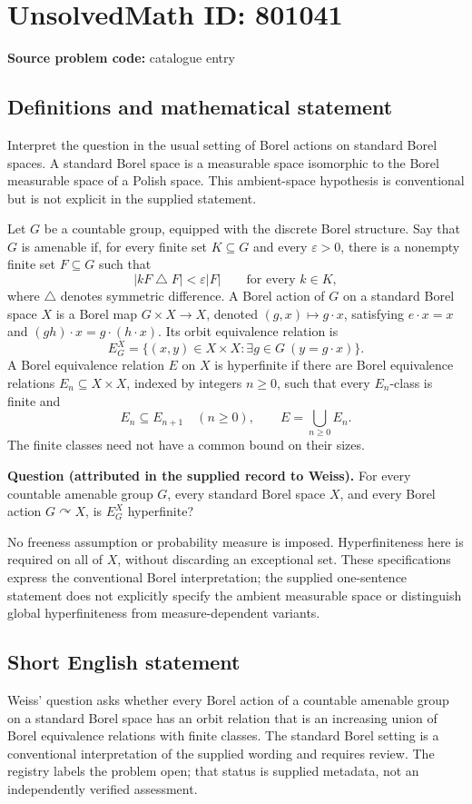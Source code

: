 \documentclass[11pt]{article}
\begin{document}
\section*{UnsolvedMath ID: 801041}
\textbf{Source problem code:} catalogue entry
\subsection{Definitions and mathematical statement}
Interpret the question in the usual setting of Borel actions on standard Borel spaces. A standard Borel space is a measurable space isomorphic to the Borel measurable space of a Polish space. This ambient-space hypothesis is conventional but is not explicit in the supplied statement.

Let \(G\) be a countable group, equipped with the discrete Borel structure. Say that \(G\) is amenable if, for every finite set \(K\subseteq G\) and every \(\varepsilon>0\), there is a nonempty finite set \(F\subseteq G\) such that
\[
 |kF\mathbin{\triangle}F|<\varepsilon |F|\qquad\text{for every }k\in K,
\]
where \(\triangle\) denotes symmetric difference. A Borel action of \(G\) on a standard Borel space \(X\) is a Borel map \(G\times X\to X\), denoted \((g,x)\mapsto g\cdot x\), satisfying \(e\cdot x=x\) and \((gh)\cdot x=g\cdot(h\cdot x)\). Its orbit equivalence relation is
\[
 E_G^X=\{(x,y)\in X\times X:\exists g\in G\ (y=g\cdot x)\}.
\]
A Borel equivalence relation \(E\) on \(X\) is hyperfinite if there are Borel equivalence relations \(E_n\subseteq X\times X\), indexed by integers \(n\geq 0\), such that every \(E_n\)-class is finite and
\[
 E_n\subseteq E_{n+1}\quad(n\geq0),\qquad E=\bigcup_{n\geq0}E_n.
\]
The finite classes need not have a common bound on their sizes.

\textbf{Question (attributed in the supplied record to Weiss).} For every countable amenable group \(G\), every standard Borel space \(X\), and every Borel action \(G\curvearrowright X\), is \(E_G^X\) hyperfinite?

No freeness assumption or probability measure is imposed. Hyperfiniteness here is required on all of \(X\), without discarding an exceptional set. These specifications express the conventional Borel interpretation; the supplied one-sentence statement does not explicitly specify the ambient measurable space or distinguish global hyperfiniteness from measure-dependent variants.
\subsection{Short English statement}
Weiss' question asks whether every Borel action of a countable amenable group on a standard Borel space has an orbit relation that is an increasing union of Borel equivalence relations with finite classes. The standard Borel setting is a conventional interpretation of the supplied wording and requires review. The registry labels the problem open; that status is supplied metadata, not an independently verified assessment.
\end{document}
